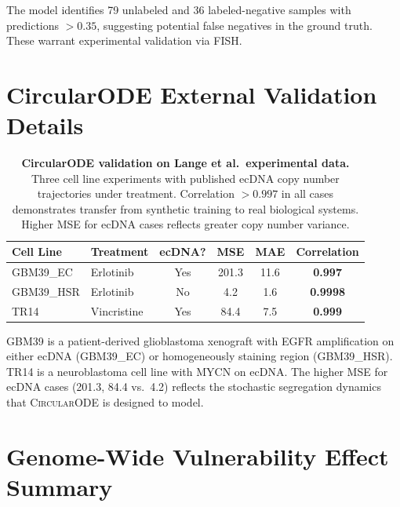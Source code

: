 \documentclass{article}
\newcommand{\circularode}{\textsc{CircularODE}}
\begin{document}
The model identifies 79 unlabeled and 36 labeled-negative samples with predictions $>0.35$, suggesting potential false negatives in the ground truth. These warrant experimental validation via FISH.


\section{CircularODE External Validation Details}
\label{app:circularode_ext}

\begin{table}[ht]
\caption{\textbf{CircularODE validation on Lange et al.\ experimental data.} Three cell line experiments with published ecDNA copy number trajectories under treatment. Correlation $>0.997$ in all cases demonstrates transfer from synthetic training to real biological systems. Higher MSE for ecDNA cases reflects greater copy number variance.}
\label{tab:circularode_ext}
\centering
\small
\begin{tabular}{@{}llcccc@{}}
\toprule
Cell Line & Treatment & ecDNA? & MSE & MAE & Correlation \\
\midrule
GBM39\_EC & Erlotinib & Yes & 201.3 & 11.6 & \textbf{0.997} \\
GBM39\_HSR & Erlotinib & No & 4.2 & 1.6 & \textbf{0.9998} \\
TR14 & Vincristine & Yes & 84.4 & 7.5 & \textbf{0.999} \\
\bottomrule
\end{tabular}
\end{table}

GBM39 is a patient-derived glioblastoma xenograft with EGFR amplification on either ecDNA (GBM39\_EC) or homogeneously staining region (GBM39\_HSR). TR14 is a neuroblastoma cell line with MYCN on ecDNA. The higher MSE for ecDNA cases (201.3, 84.4 vs.\ 4.2) reflects the stochastic segregation dynamics that \circularode{} is designed to model.


\section{Genome-Wide Vulnerability Effect Summary}
\label{app:genomewide}
\end{document}
